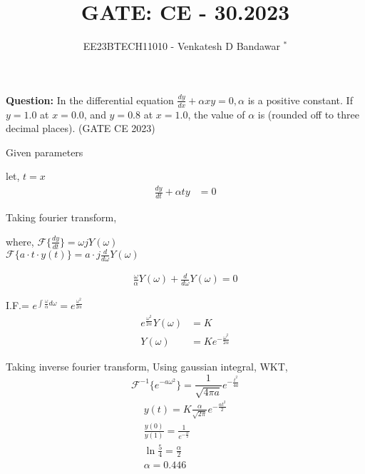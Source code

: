 \documentclass[journal,12pt,twocolumn]{IEEEtran}
\theoremstyle{remark}
\begin{document}

\vspace{3cm}

\title{GATE: CE - 30.2023}
\author{EE23BTECH11010 - Venkatesh D Bandawar $^{*}$%
}
\maketitle
\bigskip


\textbf{Question:} In the differential equation $\frac{dy}{dx} + \alpha x y = 0, \alpha$ is a positive constant. If $y = 1.0$ at
$x = 0.0$, and $y = 0.8$ at $x = 1.0$, the value of $\alpha$ is (rounded off to three decimal places).  \hfill(GATE CE 2023)

\solution
\begin{table}[!h] 
\centering

\caption{Given parameters}
\label{given parameters list.gate.ce.30}
\end{table}



let, $t=x$
\begin{align}
    \frac{dy}{dt} + \alpha t y &= 0
\end{align}

Taking fourier transform,

where,
$\mathcal{F}\{\frac{dy}{dt}\} = \omega j Y(\omega) $\\
 $\mathcal{F}\{a \cdot t \cdot y(t)\} = a \cdot j \frac{d}{d\omega} Y(\omega)$

\begin{align}
    \frac{\omega}{\alpha} Y(\omega) + \frac{d}{d\omega} Y(\omega) = 0
\end{align}

I.F.= $e^{\int\frac{\omega}{\alpha} d\omega} = e^{\frac{\omega^2}{2\alpha} }$
\begin{align}
    e^{\frac{\omega^2}{2\alpha} } Y(\omega) &= K\\
    Y(\omega) &= K e^{-\frac{\omega^2}{2\alpha} }
\end{align}

Taking inverse fourier transform, Using gaussian integral,
WKT, \[ \mathcal{F}^{-1}\{e^{-a\omega^2}\} = \frac{1}{\sqrt{4\pi a}} e^{-\frac{t^2}{4a}} \]
\begin{align}
    y(t) = K \frac{\alpha}{\sqrt{2\pi}} e^{-\frac{\alpha t^2}{2}}\\
    \frac{y(0)}{y(1)} = \frac{1}{e^{-\frac{\alpha}{2}}}\\
    \ln\frac{5}{4} = \frac{\alpha}{2} \\
    \alpha = 0.446 
\end{align}
\end{document}

